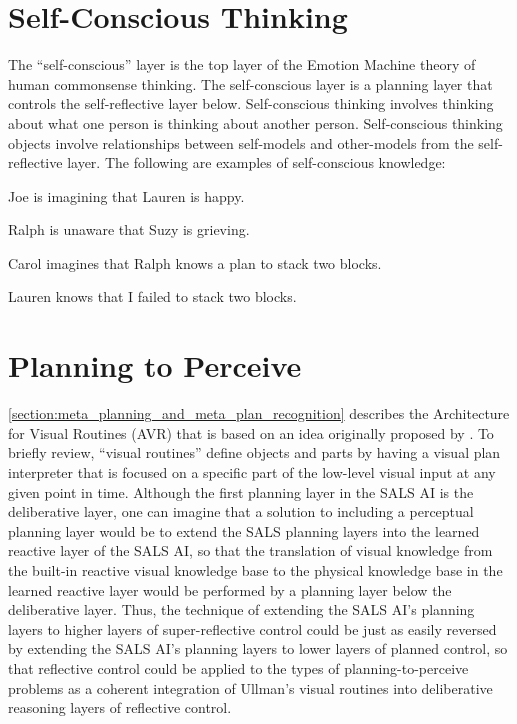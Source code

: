 \section{Self-Conscious Thinking}

The ``self-conscious'' layer is the top layer of the Emotion Machine
theory of human commonsense thinking.  The self-conscious layer is a
planning layer that controls the self-reflective layer below.
Self-conscious thinking involves thinking about what one person is
thinking about another person.  Self-conscious thinking objects
involve relationships between self-models and other-models from the
self-reflective layer.  The following are examples of self-conscious
knowledge:
\begin{packed_itemize}
\item{Joe is imagining that Lauren is happy.}
\item{Ralph is unaware that Suzy is grieving.}
\item{Carol imagines that Ralph knows a plan to stack two blocks.}
\item{Lauren knows that I failed to stack two blocks.}
\end{packed_itemize}


\section{Planning to Perceive}

{\mbox{\autoref{section:meta_planning_and_meta_plan_recognition}}}
describes the Architecture for Visual Routines (AVR) \cite[]{rao:1998}
that is based on an idea originally proposed by \cite{ullman:1984}.
To briefly review, ``visual routines'' define objects and parts by
having a visual plan interpreter that is focused on a specific part of
the low-level visual input at any given point in time.  Although the
first planning layer in the SALS AI is the deliberative layer, one can
imagine that a solution to including a perceptual planning layer would
be to extend the SALS planning layers into the learned reactive layer
of the SALS AI, so that the translation of visual knowledge from the
built-in reactive visual knowledge base to the physical knowledge base
in the learned reactive layer would be performed by a planning layer
below the deliberative layer.  Thus, the technique of extending the
SALS AI's planning layers to higher layers of super-reflective control
could be just as easily reversed by extending the SALS AI's planning
layers to lower layers of planned control, so that reflective control
could be applied to the types of planning-to-perceive problems as a
coherent integration of Ullman's visual routines into deliberative
reasoning layers of reflective control.

